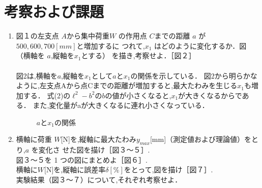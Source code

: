 \documentclass[a4paper,12pt]{jsarticle}
\begin{document}
\section{考察および課題}
\begin{enumerate}
  \item 図１の左支点 $A$から集中荷重$ W$ の作用点 $C $までの距離 $a$ が $500,600,700 [mm]$と増加するに
  つれて,$x_1$ はどのように変化するか．図（横軸を $a $,縦軸を$x_1$とする） を描き,考察せよ．［図２］\\
  \\
  \quad 図2は,横軸を$a$,縦軸を$x_1$として$a$と$x_1$の関係を示している．
  図2から明らかなように,左支点Aから点Cまでの距離が増加すると,最大たわみを生じる$x_1$も増加する．
  式(2)の$\ell^2-b^2$の$b$の値が小さくなると,$x_1$が大きくなるからである．
  また,変化量がaが大きくなるに連れ小さくなっている．

\clearpage
\begin{figure}[h]
  \centering
  \caption{$a$と$x_1$の関係}
\end{figure}
\clearpage

\item 横軸に荷重 $W $[N]を,縦軸に最大たわみ$ y_{max}$[mm]（測定値および理論値）をとり,$a$ を変化さ
せた図を描け［図３～５］.\\
図３～５を 1 つの図にまとめよ［図６］.\\
横軸に$ W $[N]を,縦軸に誤差率$ \delta [\%]$をとって,図を描け［図７］.\\
実験結果（図３～７）について,それぞれ考察せよ．\\
  

\end{enumerate}
\end{document}
